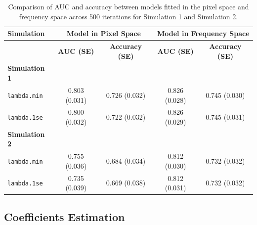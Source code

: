 \documentclass[12pt]{article}
\begin{document}
\begin{table}[h!]
	\centering
	\caption{Comparison of AUC and accuracy between models fitted in the pixel space and frequency space across 500 iterations for Simulation 1 and Simulation 2.}
	\label{tab:auc_acc_table}
	\begin{tabular}{l|cc|cc}
		\toprule
		\textbf{Simulation}   & \multicolumn{2}{c}{\textbf{Model in Pixel Space}} & \multicolumn{2}{c}{\textbf{Model in Frequency Space}}                                              \\
		\midrule
		                      & \textbf{AUC (SE)}                                 & \textbf{Accuracy (SE)}                                & \textbf{AUC (SE)} & \textbf{Accuracy (SE)} \\
		\midrule
		\textbf{Simulation 1} &                                                   &                                                       &                   &                        \\
    \texttt{lambda.min}            & 0.803 (0.031)                                     & 0.726 (0.032)                                         & 0.826 (0.028)     & 0.745 (0.030)          \\
      \texttt{lambda.1se}            & 0.800 (0.032)                                     & 0.722 (0.032)                                         & 0.826 (0.029)     & 0.745 (0.031)          \\
		\midrule
		\textbf{Simulation 2} &                                                   &                                                       &                   &                        \\
    \texttt{lambda.min}            & 0.755 (0.036)                                     & 0.684 (0.034)                                         & 0.812 (0.030)     & 0.732 (0.032)          \\
      \texttt{lambda.1se}            & 0.735 (0.039)                                     & 0.669 (0.038)                                         & 0.812 (0.031)     & 0.732 (0.032)          \\
		\bottomrule
	\end{tabular}
\end{table}

\subsection*{Coefficients Estimation}
\end{document}
